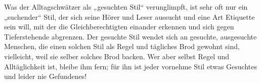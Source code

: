 Was der Alltagschwätzer als „gesuchten Stil“ verunglimpft, ist sehr oft nur ein „suchender“ Stil, der sich seine Hörer und Leser aussucht und eine Art Etiquette sein will, mit der die Gleichberechtigten einander erkennen und sich gegen Tieferstehende abgrenzen. Der gesuchte Stil wendet sich an gesuchte, ausgesuchte Menschen, die einen solchen Stil als Regel und tägliches Brod gewohnt sind, vielleicht, weil sie selber solches Brod backen. Wer aber selbst Regel und Alltäglichkeit ist, bleibe ihm fern; für ihn ist jeder vornehme Stil etwas Gesuchtes und leider nie Gefundenes!
\par

